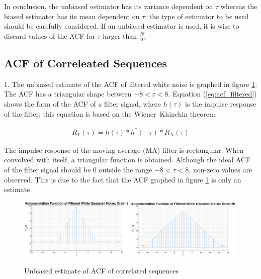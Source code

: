 \documentclass{article}
\begin{document}
In conclusion, the unbiased estimator has its variance dependent on $\tau$ whereas the biased estimator has its mean dependent on $\tau$; the type of estimator to be used should be carefully considered. If an unbiased estimator is used, it is wise to discard values of the ACF for $\tau$ larger than $\frac{N}{10}$.

\subsection{ACF of Correleated Sequences}\label{sec:acf_correlated}

1. The unbiased estimate of the ACF of filtered white noise is graphed in figure \ref{fig:acf_correlated}. The ACF has a triangular shape between $-8<\tau<8$. Equation (\ref{eq:acf_filtered}) shows the form of the ACF of a filter signal, where $h(\tau)$ is the impulse response of the filter; this equation is based on the Wiener–Khinchin theorem.

\begin{align}
    R_{Y}(\tau) = h(\tau) \ast h^{*}(-\tau) \ast R_{X}(\tau)\label{eq:acf_filtered}
\end{align}

The impulse response of the moving average (MA) filter is rectangular. When convolved with itself, a triangular function is obtained. Although the ideal ACF of the filter signal should be $0$ outside the range $-8<\tau<8$, non-zero values are observed. This is due to the fact that the ACF graphed in figure \ref{fig:acf_correlated} is only an estimate. 

\begin{figure}[H]
    \centering
    \includegraphics[width=0.49\textwidth]{acf_correlated}
    \includegraphics[width=0.49\textwidth]{acf_correlated_order_20}
    \caption{Unbiased estimate of ACF of correlated sequences}
    \label{fig:acf_correlated}
\end{figure}
\end{document}
